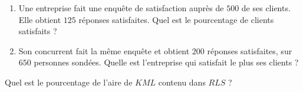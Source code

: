 
\setcounter{exorituel}{0}

\begin{rituel}
    
\begin{enumerate}
    \item
        Une entreprise fait une enquête de satisfaction auprès de \( 500\) de ses clients. Elle obtient \( 125\) réponses satisfaites. Quel est le pourcentage de clients satisfaits ?
    \item
        Son concurrent fait la même enquête et obtient \( 200\) réponses satisfaites, sur \( 650\) personnes sondées. Quelle est l'entreprise qui satisfait le plus ses clients ?
\end{enumerate}

\end{rituel}


\begin{rituel}
    
\begin{center}
    
\end{center}

Quel est le pourcentage de l'aire de \( KML\) contenu dans \( RLS\) ?

\end{rituel}
